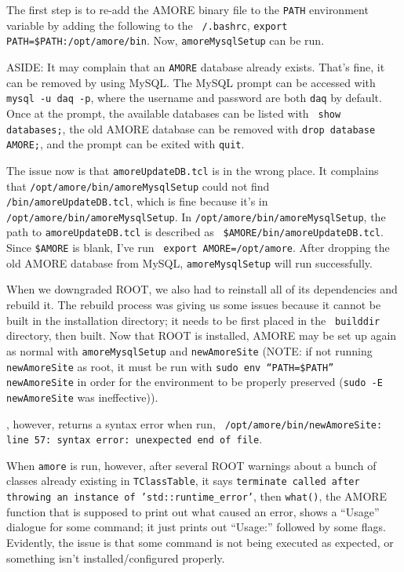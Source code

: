 \documentclass[12pt]{article}
\begin{document}
\qq The first step is to re-add the AMORE binary file to the {\tt PATH}
environment variable by adding the following to the {\tt ~/.bashrc}, {\tt export
  PATH=\$PATH:/opt/amore/bin}. Now, {\tt amoreMysqlSetup} can be run. 

\qq ASIDE: It may complain that an {\tt AMORE} database already exists. That's fine, it
can be removed by using MySQL. The MySQL prompt can be accessed with {\tt mysql
  -u daq -p}, where the username and password are both {\tt daq} by
default. Once at the prompt, the available databases can be listed with {\tt
  show databases;}, the old AMORE database can be removed with {\tt drop
  database AMORE;}, and the prompt can be exited with {\tt quit}.

\qq The issue now is that {\tt amoreUpdateDB.tcl} is in the wrong place. It
complains that {\tt /opt/amore/bin/amoreMysqlSetup} could not find {\tt
  /bin/amoreUpdateDB.tcl}, which is fine because it's in {\tt
  /opt/amore/bin/amoreMysqlSetup}. In {\tt /opt/amore/bin/amoreMysqlSetup}, the
path to {\tt amoreUpdateDB.tcl} is described as {\tt
  \$AMORE/bin/amoreUpdateDB.tcl}. Since {\tt \$AMORE} is blank, I've run {\tt
  export AMORE=/opt/amore}. After dropping the old AMORE database from MySQL,
{\tt amoreMysqlSetup} will run successfully.

\qq When we downgraded ROOT, we also had to reinstall all of its dependencies
and rebuild it. The rebuild process was giving us some issues because it cannot
be built in the installation directory; it needs to be first placed in the {\tt
  builddir} directory, then built. Now that ROOT is installed, AMORE may be set
up again as normal with {\tt amoreMysqlSetup} and {\tt newAmoreSite} (NOTE: if
not running {\tt newAmoreSite} as root, it must be run with {\tt sudo env
  ``PATH=\$PATH'' newAmoreSite} in order for the environment to be properly
preserved ({\tt sudo -E newAmoreSite} was ineffective)).

, however, returns a syntax error when run, {\tt
  /opt/amore/bin/newAmoreSite: line 57: syntax error: unexpected end of file}. 

\qq When {\tt amore} is run, however, after several ROOT warnings about a bunch
of classes already existing in {\tt TClassTable}, it says {\tt terminate called
  after throwing an instance of 'std::runtime\_error'}, then {\tt what()}, the
AMORE function that is supposed to print out what caused an error, shows a
``Usage'' dialogue for some command; it just prints out ``Usage:'' followed by
some flags. Evidently, the issue is that some command
is not being executed as expected, or something isn't installed/configured
properly.
\end{document}
